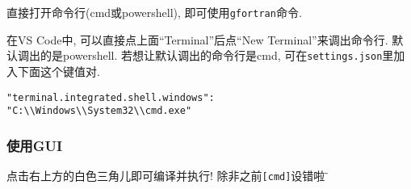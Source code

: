 直接打开命令行(cmd或powershell), 即可使用\texttt{gfortran}命令.

在VS Code中, 可以直接点上面``Terminal''后点``New Terminal''来调出命令行. 默认调出的是powershell. 若想让默认调出的命令行是cmd, 可在\texttt{settings.json}里加入下面这个键值对.
\begin{lstlisting}
"terminal.integrated.shell.windows":
"C:\\Windows\\System32\\cmd.exe"
\end{lstlisting}

\subsubsection{使用GUI}
点击右上方的白色三角儿即可编译并执行! 除非之前\texttt{[cmd]}设错啦$\!\text{\~{}}$
